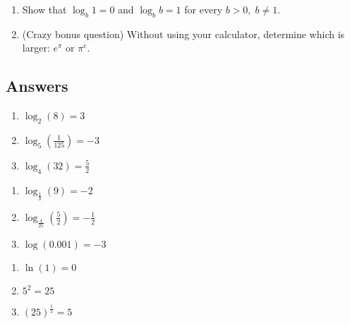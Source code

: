 \begin{enumerate}
\setcounter{enumi}{\value{HW}}

\item Show that $\log_{b} 1 = 0$ and $\log_{b} b = 1$ for every $b > 0, \; b \neq 1$.

\item (Crazy bonus question) Without using your calculator, determine which is larger: $e^{\pi}$ or $\pi^{e}$.

\setcounter{HW}{\value{enumi}}
\end{enumerate}


\newpage

\subsection{Answers}

\begin{multicols}{3}
\begin{enumerate}

\item $\log_{2}(8) = 3$

\item  $\log_{5}\left(\frac{1}{125}\right) = -3$

\item  $\log_{4}(32) = \frac{5}{2}$

\setcounter{HW}{\value{enumi}}
\end{enumerate}
\end{multicols}

\begin{multicols}{3}
\begin{enumerate}
\setcounter{enumi}{\value{HW}}


\item  $\log_{\frac{1}{3}}(9) = -2$

\item  $\log_{\frac{4}{25}}\left(\frac{5}{2}\right) = -\frac{1}{2}$

\item  $\log(0.001) = -3$

\setcounter{HW}{\value{enumi}}
\end{enumerate}
\end{multicols}

\begin{multicols}{3}
\begin{enumerate}
\setcounter{enumi}{\value{HW}}


\item  $\ln(1) = 0$

\item  $5^{2} = 25$

\item  $(25)^{\frac{1}{2}} = 5$

\setcounter{HW}{\value{enumi}}
\end{enumerate}
\end{multicols}

